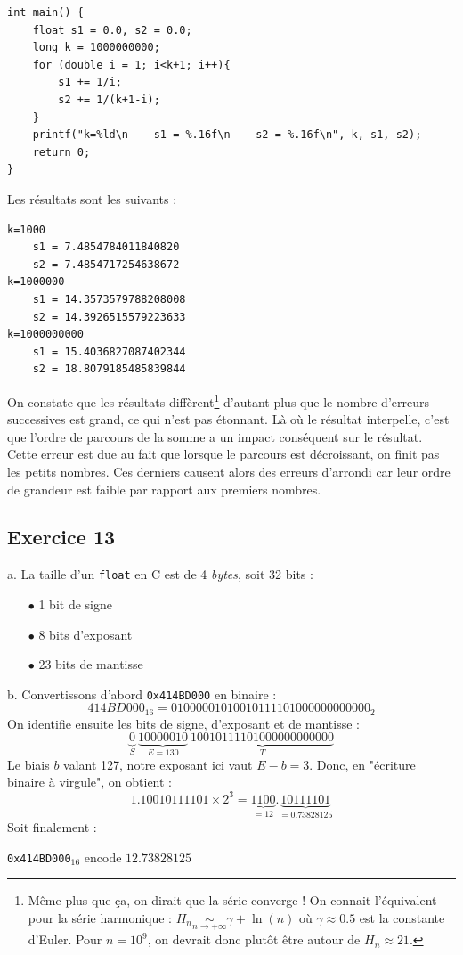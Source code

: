 \documentclass[11pt, a4 paper]{article}
\begin{document}
\begin{lstlisting}[style=CStyle]
int main() {
    float s1 = 0.0, s2 = 0.0;
    long k = 1000000000;
    for (double i = 1; i<k+1; i++){
        s1 += 1/i;
        s2 += 1/(k+1-i);
    }
    printf("k=%ld\n    s1 = %.16f\n    s2 = %.16f\n", k, s1, s2);
    return 0;
}
\end{lstlisting}

Les résultats sont les suivants :
\begin{lstlisting}[style=CStyle]
k=1000
    s1 = 7.4854784011840820
    s2 = 7.4854717254638672
k=1000000
    s1 = 14.3573579788208008
    s2 = 14.3926515579223633
k=1000000000
    s1 = 15.4036827087402344
    s2 = 18.8079185485839844
\end{lstlisting}
On constate que les résultats diffèrent\footnote{Même plus que ça, on dirait que la série converge ! On connait l'équivalent pour la série harmonique : $H_n \underset{n \to +\infty}{\sim} \gamma + \ln(n)$ où $\gamma \approx 0.5$ est la constante d'Euler. Pour $n = 10^9$, on devrait donc plutôt être autour de $H_n \approx 21$.} d'autant plus que le nombre d'erreurs successives est grand, ce qui n'est pas étonnant. Là où le résultat interpelle, c'est que l'ordre de parcours de la somme a un impact conséquent sur le résultat.\\
Cette erreur est due au fait que lorsque le parcours est décroissant, on finit pas les petits nombres. Ces derniers causent alors des erreurs d'arrondi car leur ordre de grandeur est faible par rapport aux premiers nombres.

\subsection{Exercice 13}
a. La taille d'un \texttt{float} en C est de 4 \textit{bytes}, soit 32 bits :
\begin{itemize}
    \item[$\bullet$] 1 bit de signe
    \item[$\bullet$] 8 bits d'exposant
    \item[$\bullet$] 23 bits de mantisse
\end{itemize}

b. Convertissons d'abord \texttt{0x414BD000} en binaire :
\begin{equation*}
    414BD000_{16} = 01000001010010111101000000000000_2
\end{equation*}
On identifie ensuite les bits de signe, d'exposant et de mantisse :
\begin{equation*}
    \underset{S}{\underbrace{0}}~\underset{E=130}{\underbrace{10000010}}~\underset{T}{\underbrace{10010111101000000000000}}
\end{equation*}
Le biais $b$ valant 127, notre exposant ici vaut $E-b = 3$. Donc, en "écriture binaire à virgule", on obtient :
\begin{equation*}
    1.10010111101 \times 2^3 = \underset{=12}{\underbrace{1100}}.\underset{=0.73828125}{\underbrace{10111101}}
\end{equation*}
Soit finalement :
\begin{center}
    \texttt{0x414BD000}$_{16}$ encode $12.73828125$
\end{center}
\end{document}
